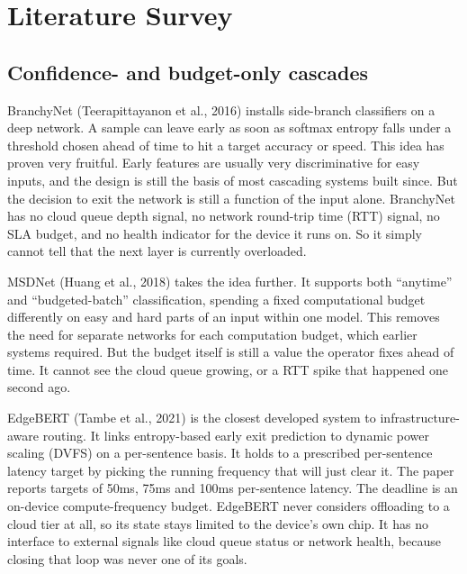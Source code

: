 \hypertarget{literature-survey}{%
\section{Literature Survey}\label{literature-survey}}

\hypertarget{confidence-and-budget-only-cascades}{%
\subsection{Confidence- and budget-only
cascades}\label{confidence--and-budget-only-cascades}}

BranchyNet (Teerapittayanon et al., 2016) installs side-branch
classifiers on a deep network. A sample can leave early as soon as
softmax entropy falls under a threshold chosen ahead of time to hit a
target accuracy or speed. This idea has proven very fruitful. Early features
are usually very discriminative for easy inputs, and the design is
still the basis of most cascading systems built since. But the decision
to exit the network is still a function of the input alone. BranchyNet
has no cloud queue depth signal, no network round-trip time (RTT)
signal, no SLA budget, and no health indicator for the device it runs
on. So it simply cannot tell that the next layer is currently
overloaded.

MSDNet (Huang et al., 2018) takes the idea further. It supports both
``anytime'' and ``budgeted-batch'' classification, spending a fixed
computational budget differently on easy and hard parts of an input
within one model. This removes the need for separate networks for each
computation budget, which earlier systems required. But the budget
itself is still a value the operator fixes ahead of time. It cannot see the
cloud queue growing, or a RTT spike that happened one second ago.

EdgeBERT (Tambe et al., 2021) is the closest developed system
to infrastructure-aware routing. It links entropy-based early
exit prediction to dynamic power scaling (DVFS) on a per-sentence
basis. It holds to a prescribed per-sentence latency target by
picking the running frequency that will just clear it. The paper reports 
targets of 50ms, 75ms and 100ms per-sentence latency. The deadline is an
on-device compute-frequency budget. EdgeBERT never considers offloading 
to a cloud tier at all, so its state stays limited to the device's own chip.
It has no interface to external signals like cloud queue status or network health,
because closing that loop was never one of its goals.

